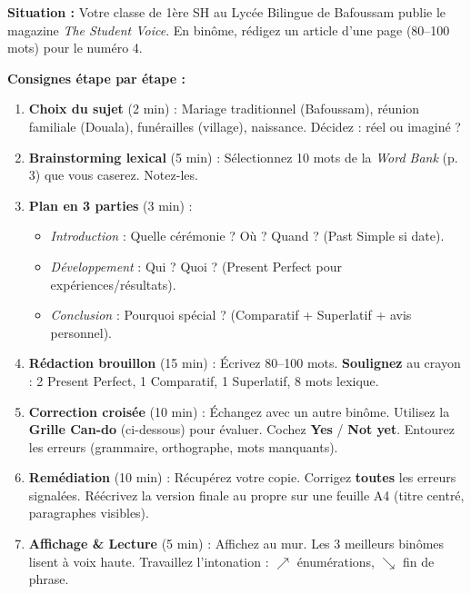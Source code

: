 \documentclass[11pt]{article}
\begin{document}
\begin{experience}
\textbf{Situation :} Votre classe de 1ère SH au Lycée Bilingue de Bafoussam publie le magazine \emph{The Student Voice}. En binôme, rédigez un article d'une page (80--100 mots) pour le numéro 4.

\textbf{Consignes étape par étape :}
\begin{enumerate}
\item \textbf{Choix du sujet} (2 min) : Mariage traditionnel (Bafoussam), réunion familiale (Douala), funérailles (village), naissance. Décidez : réel ou imaginé ?
\item \textbf{Brainstorming lexical} (5 min) : Sélectionnez 10 mots de la \emph{Word Bank} (p. 3) que vous caserez. Notez-les.
\item \textbf{Plan en 3 parties} (3 min) :
      \begin{itemize}
      \item \emph{Introduction} : Quelle cérémonie ? Où ? Quand ? (Past Simple si date).
      \item \emph{Développement} : Qui ? Quoi ? (Present Perfect pour expériences/résultats).
      \item \emph{Conclusion} : Pourquoi spécial ? (Comparatif + Superlatif + avis personnel).
      \end{itemize}
\item \textbf{Rédaction brouillon} (15 min) : Écrivez 80--100 mots. \textbf{Soulignez} au crayon : 2 Present Perfect, 1 Comparatif, 1 Superlatif, 8 mots lexique.
\item \textbf{Correction croisée} (10 min) : Échangez avec un autre binôme. Utilisez la \textbf{Grille Can-do} (ci-dessous) pour évaluer. Cochez \textbf{Yes} / \textbf{Not yet}. Entourez les erreurs (grammaire, orthographe, mots manquants).
\item \textbf{Remédiation} (10 min) : Récupérez votre copie. Corrigez \textbf{toutes} les erreurs signalées. Réécrivez la version finale au propre sur une feuille A4 (titre centré, paragraphes visibles).
\item \textbf{Affichage \& Lecture} (5 min) : Affichez au mur. Les 3 meilleurs binômes lisent à voix haute. Travaillez l'intonation : $\nearrow$ énumérations, $\searrow$ fin de phrase.
\end{enumerate}
\end{experience}
\end{document}
